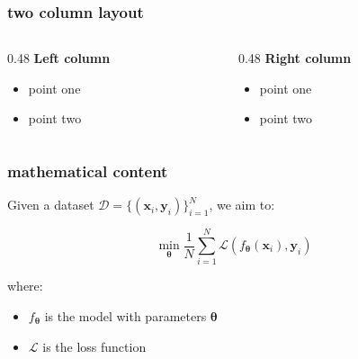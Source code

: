 \documentclass[aspectratio=169, 14pt]{beamer}
\newcommand{\B}{\mathbf}
\newcommand{\Bs}{\boldsymbol}
\begin{document}
\begin{frame}

    \frametitle{two column layout}

    \begin{columns}[T]

        \begin{column}{0.48\textwidth}
            \textbf{Left column}
            \begin{itemize}
                \item point one
                \item point two
            \end{itemize}
        \end{column}

        \begin{column}{0.48\textwidth}
            \textbf{Right column}
            \begin{itemize}
                \item point one
                \item point two
            \end{itemize}
        \end{column}

    \end{columns}

\end{frame}


\begin{frame}

    \frametitle{mathematical content}

    \vspace{-0.5em}

    Given a dataset $\mathcal{D} = \{(\B{x}_i, \B{y}_i)\}_{i=1}^{N}$, we aim to:

    \vspace{1em}

    \begin{equation*}
        \min_{\Bs{\theta}} \frac{1}{N} \sum_{i=1}^{N} \mathcal{L}(f_{\Bs{\theta}}(\B{x}_i), \B{y}_i)
    \end{equation*}

    \vspace{1em}

    where:
    \begin{itemize}
        \setlength{\itemindent}{-1em}
        \setlength\itemsep{0.5em}
        \item $f_{\Bs{\theta}}$ is the model with parameters $\Bs{\theta}$
        \item $\mathcal{L}$ is the loss function
    \end{itemize}

\end{frame}
\end{document}
